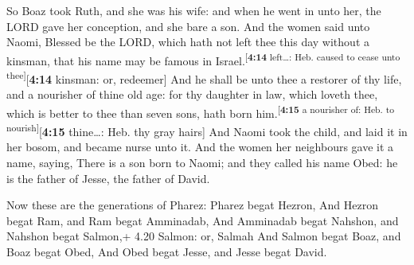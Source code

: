  So Boaz took Ruth, and she was his wife: and when he
went in unto her, the LORD gave her conception, and she bare a son.
 And the women said unto Naomi, Blessed be the LORD,
which hath not left thee this day without a kinsman, that his name may
be famous in Israel.\textsuperscript{{[}\textbf{4:14} left\ldots: Heb.
caused to cease unto thee{]}}{[}\textbf{4:14} kinsman: or, redeemer{]}
 And he shall be unto thee a restorer of thy life, and a
nourisher of thine old age: for thy daughter in law, which loveth thee,
which is better to thee than seven sons, hath born
him.\textsuperscript{{[}\textbf{4:15} a nourisher of: Heb. to
nourish{]}}{[}\textbf{4:15} thine\ldots: Heb. thy gray hairs{]}
 And Naomi took the child, and laid it in her bosom, and
became nurse unto it.  And the women her neighbours gave
it a name, saying, There is a son born to Naomi; and they called his
name Obed: he is the father of Jesse, the father of David.

 Now these are the generations of Pharez: Pharez begat
Hezron,  And Hezron begat Ram, and Ram begat Amminadab,
 And Amminadab begat Nahshon, and Nahshon begat Salmon,+
4.20 Salmon: or, Salmah  And Salmon begat Boaz, and Boaz
begat Obed,  And Obed begat Jesse, and Jesse begat David.
